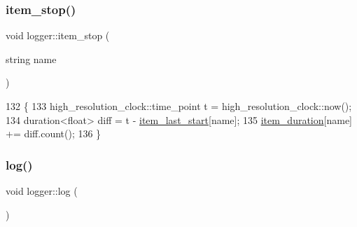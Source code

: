 \subsubsection{\texorpdfstring{item\+\_\+stop()}{item\_stop()}}
{\footnotesize\ttfamily void logger\+::item\+\_\+stop (\begin{DoxyParamCaption}\item[{string}]{name }\end{DoxyParamCaption})\hspace{0.3cm}{\ttfamily [static]}}


\begin{DoxyCode}
132                                  \{
133   high\_resolution\_clock::time\_point t = high\_resolution\_clock::now();
134   duration<float> diff = t - \hyperlink{classlogger_af21bf7ca37e55cf225b282ab2f312c95}{item\_last\_start}[name];
135   \hyperlink{classlogger_a8097637b66086185096030c96a1189ba}{item\_duration}[name] += diff.count();
136 \}
\end{DoxyCode}
\mbox{\label{classlogger_ab518e6d927694bb7329e933fa75c27bf}} 
\subsubsection{\texorpdfstring{log()}{log()}}
{\footnotesize\ttfamily void logger\+::log (\begin{DoxyParamCaption}{ }\end{DoxyParamCaption})\hspace{0.3cm}{\ttfamily [static]}}


